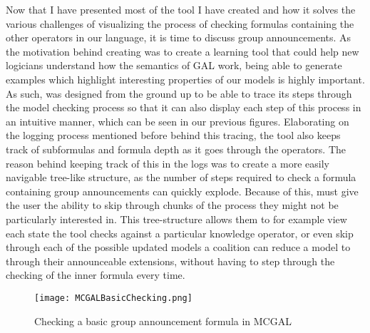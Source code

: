 Now that I have presented most of the tool I have created and how it solves the various challenges of visualizing the process of checking formulas containing the other operators in our language, it is time to discuss group announcements. As the motivation behind creating \cname{} was to create a learning tool that could help new logicians understand how the semantics of GAL work, being able to generate examples which highlight interesting properties of our models is highly important. As such, \cname{} was designed from the ground up to be able to trace its steps through the model checking process so that it can also display each step of this process in an intuitive manner, which can be seen in our previous figures. Elaborating on the logging process mentioned before behind this tracing, the tool also keeps track of subformulas and formula depth as it goes through the operators. The reason behind keeping track of this in the logs was to create a more easily navigable tree-like structure, as the number of steps required to check a formula containing group announcements can quickly explode. Because of this, \cname{} must give the user the ability to skip through chunks of the process they might not be particularly interested in. This tree-structure allows them to for example view each state the tool checks against a particular knowledge operator, or even skip through each of the possible updated models a coalition can reduce a model to through their announceable extensions, without having to step through the checking of the inner formula every time. 
 
\begin{figure}[]
	\texttt{[image: MCGALBasicChecking.png]}
	\caption{Checking a basic group announcement formula in MCGAL}
	\label{fig:basicGalChecking}
\end{figure}


